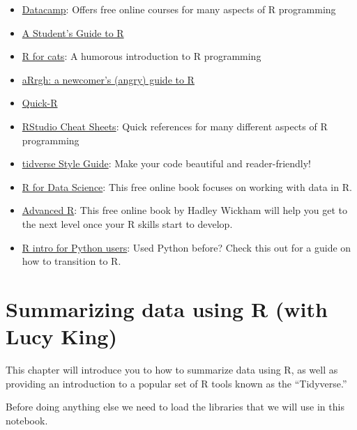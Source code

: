 \documentclass[12pt,]{book}
\newenvironment{Shaded}{\begin{snugshade}}{\end{snugshade}}
\newcommand{\DataTypeTok}[1]{\textcolor[rgb]{0.13,0.29,0.53}{#1}}
\newcommand{\DecValTok}[1]{\textcolor[rgb]{0.00,0.00,0.81}{#1}}
\newcommand{\KeywordTok}[1]{\textcolor[rgb]{0.13,0.29,0.53}{\textbf{#1}}}
\newcommand{\NormalTok}[1]{#1}
\newcommand{\OperatorTok}[1]{\textcolor[rgb]{0.81,0.36,0.00}{\textbf{#1}}}
\providecommand{\tightlist}{%
  \setlength{\itemsep}{0pt}\setlength{\parskip}{0pt}}
\begin{document}
\begin{itemize}
\tightlist
\item
  \href{https://www.datacamp.com/}{Datacamp}: Offers free online courses for many aspects of R programming
\item
  \href{https://cran.r-project.org/doc/contrib/Horton+Pruim+Kaplan_MOSAIC-StudentGuide.pdf}{A Student's Guide to R}
\item
  \href{https://rforcats.net/}{R for cats}: A humorous introduction to R programming
\item
  \href{http://arrgh.tim-smith.us/}{aRrgh: a newcomer's (angry) guide to R}
\item
  \href{http://www.statmethods.net/index.html}{Quick-R}
\item
  \href{https://www.rstudio.com/resources/cheatsheets/}{RStudio Cheat Sheets}: Quick references for many different aspects of R programming
\item
  \href{https://style.tidyverse.org/}{tidverse Style Guide}: Make your code beautiful and reader-friendly!
\item
  \href{http://r4ds.had.co.nz/index.html}{R for Data Science}: This free online book focuses on working with data in R.
\item
  \href{http://adv-r.had.co.nz/}{Advanced R}: This free online book by Hadley Wickham will help you get to the next level once your R skills start to develop.
\item
  \href{http://ramnathv.github.io/pycon2014-r/}{R intro for Python users}: Used Python before? Check this out for a guide on how to transition to R.
\end{itemize}

\hypertarget{summarizing-data-using-r-with-lucy-king}{%
\chapter{Summarizing data using R (with Lucy King)}\label{summarizing-data-using-r-with-lucy-king}}

This chapter will introduce you to how to summarize data using R, as well as providing an introduction to a popular set of R tools known as the ``Tidyverse.''

Before doing anything else we need to load the libraries that we will use in this notebook.

\begin{Shaded}
\end{Shaded}
\end{document}
